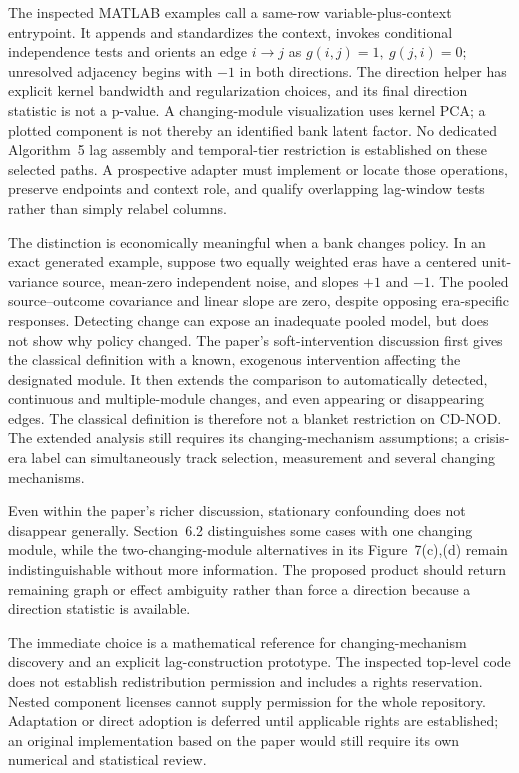 The inspected MATLAB examples call a same-row variable-plus-context
entrypoint. It appends and standardizes the context, invokes conditional
independence tests and orients an edge $i\to j$ as
$g(i,j)=1,\ g(j,i)=0$; unresolved adjacency begins with $-1$ in both
directions. The direction helper has explicit kernel bandwidth and
regularization choices, and its final direction statistic is not a p-value.
A changing-module visualization uses kernel PCA; a plotted component is not
thereby an identified bank latent factor. No dedicated Algorithm~5 lag
assembly and temporal-tier restriction is established on these selected
paths. A prospective adapter must implement or locate those operations,
preserve endpoints and context role, and qualify overlapping lag-window
tests rather than simply relabel columns.
\citep{exec17_temporal_cdnod}

The distinction is economically meaningful when a bank changes policy.
In an exact generated example, suppose two equally weighted eras have a
centered unit-variance source, mean-zero independent noise, and slopes
$+1$ and $-1$. The pooled source--outcome covariance and linear slope are
zero, despite opposing era-specific responses. Detecting change can expose
an inadequate pooled model, but does not show why policy changed. The paper's
soft-intervention discussion first gives the classical definition with a
known, exogenous intervention affecting the designated module. It then
extends the comparison to automatically detected, continuous and
multiple-module changes, and even appearing or disappearing edges.
The classical definition is therefore not a blanket restriction on CD-NOD.
The extended analysis still requires its changing-mechanism assumptions;
a crisis-era label can simultaneously track selection, measurement and
several changing mechanisms.
\citep{exec17_temporal_oracle,exec17_temporal_cdnod_paper}

Even within the paper's richer discussion, stationary confounding does not
disappear generally. Section~6.2 distinguishes some cases with one changing
module, while the two-changing-module alternatives in its Figure~7(c),(d)
remain indistinguishable without more information. The proposed product
should return remaining graph or effect ambiguity rather than force a
direction because a direction statistic is available.
\citep{exec17_temporal_cdnod_paper}

The immediate choice is a mathematical reference for changing-mechanism
discovery and an explicit lag-construction prototype. The inspected top-level
code does not establish redistribution permission and includes a rights
reservation. Nested component licenses cannot supply permission for the
whole repository. Adaptation or direct adoption is deferred until applicable
rights are established; an original implementation based on the paper would
still require its own numerical and statistical review.
\citep{exec17_temporal_cdnod,exec17_temporal_contract}


